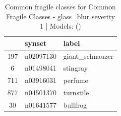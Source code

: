 \begin{table}
\caption{Common fragile classes for Common Fragile Classes - glass_blur severity 1 | Models: ()}
\label{tab:Common Fragile Classes - glass_blur severity 1_d41d8cd9}
\begin{tabular}{cll}
\toprule
 & synset & label \\
\midrule
197 & n02097130 & giant_schnauzer \\
6 & n01498041 & stingray \\
711 & n03916031 & perfume \\
877 & n04501370 & turnstile \\
30 & n01641577 & bullfrog \\
\bottomrule
\end{tabular}
\end{table}
